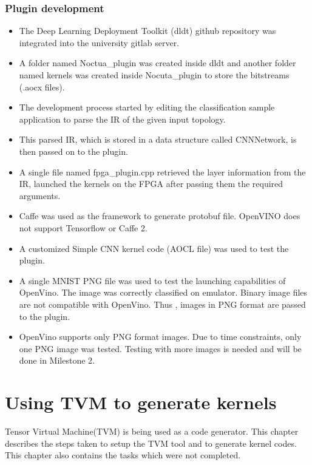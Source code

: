\documentclass[titlepage]{report}
\begin{document}
\subsection{Plugin development}
\begin{itemize}
\item The Deep Learning Deployment Toolkit (dldt) github repository was integrated into the university gitlab server. 
\item A folder named Noctua\_plugin was created inside dldt and another folder named kernels was created inside Nocuta\_plugin to store the bitstreams (.aocx files).
\item The development process started by editing the classification sample application to parse the IR of the given input topology. 
\item This parsed IR, which is stored in a data structure called CNNNetwork, is then passed on to the plugin. 
\item A single file named fpga\_plugin.cpp retrieved the layer information from the IR, launched the kernels on the FPGA after passing them the required arguments.
\item Caffe was used as the framework to generate protobuf file. OpenVINO does not support Tensorflow or Caffe 2.
\item A customized Simple CNN kernel code (AOCL file) was used to test the plugin.
\item A single MNIST PNG file was used to test the launching capabilities of OpenVino. The image was correctly classified on emulator. Binary image files are not compatible with OpenVino. Thus , images in PNG format are passed to the plugin.
\item OpenVino supports only PNG format images. Due to time constraints, only one PNG image was tested. Testing with more images is needed and will be done in Milestone 2.
 
\end{itemize} 




\chapter{Using TVM to generate kernels}
Tensor Virtual Machine(TVM) is being used as a code generator. This chapter describes the steps taken to setup the TVM tool and to generate kernel codes. This chapter also contains the tasks which were not completed.
\end{document}
